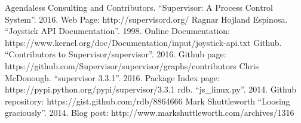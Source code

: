 \documentclass[titlepage]{article}
\begin{document}
\begin{thebibliography}{1}
 Agendaless Consulting and Contributors. ``Supervisor: A Process Control System''. 2016. Web Page: http://supervisord.org/
 Ragnar Hojland Espinosa. ``Joystick API Documentation''. 1998. Online Documentation: https://www.kernel.org/doc/Documentation/input/joystick-api.txt
 Github. ``Contributors to Supervisor/supervisor''. 2016. Github page: https://github.com/Supervisor/supervisor/graphs/contributors 
 Chris McDonough. ``supervisor 3.3.1''. 2016. Package Index page: https://pypi.python.org/pypi/supervisor/3.3.1
 rdb. ``js\_linux.py''. 2014. Github repository: https://gist.github.com/rdb/8864666
 Mark Shuttleworth ``Loosing graciously''. 2014. Blog post:  http://www.markshuttleworth.com/archives/1316
\end{thebibliography}
\end{document}

